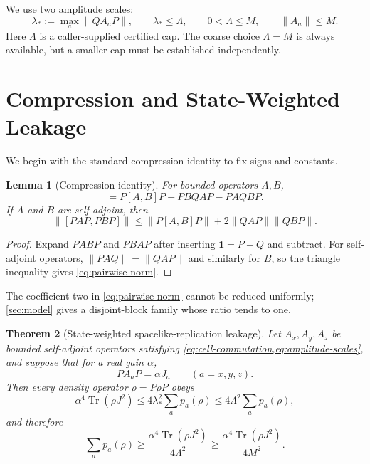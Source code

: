\documentclass[11pt]{article}
\newtheorem{theorem}{Theorem}
\newtheorem{lemma}[theorem]{Lemma}
\theoremstyle{remark}
\newcommand{\1}{\mathbf 1}
\newcommand{\Tr}{\operatorname{Tr}}
\begin{document}
We use two amplitude scales:
\begin{equation}
  \lambda_*:=\max_a\lVert Q A_aP\rVert,
  \qquad \lambda_*\leq\Lambda,
  \qquad 0<\Lambda\leq M,
  \qquad \lVert A_a\rVert\leq M.
  \label{eq:amplitude-scales}
\end{equation}
Here $\Lambda$ is a caller-supplied certified cap. The coarse choice
$\Lambda=M$ is always available, but a smaller cap must be established
independently.

\section{Compression and State-Weighted Leakage}
\label{sec:main}

We begin with the standard compression identity to fix signs and constants.

\begin{lemma}[Compression identity]
\label{lem:compression}
For bounded operators $A,B$,
\begin{equation}
  [PAP,PBP]
  =P[A,B]P+PBQAP-PAQBP.
  \label{eq:compression-identity}
\end{equation}
If $A$ and $B$ are self-adjoint, then
\begin{equation}
  \lVert[PAP,PBP]\rVert
  \leq \lVert P[A,B]P\rVert
       +2\lVert QAP\rVert\lVert QBP\rVert.
  \label{eq:pairwise-norm}
\end{equation}
\end{lemma}

\begin{proof}
Expand $PABP$ and $PBAP$ after inserting $\1=P+Q$ and subtract. For
self-adjoint operators,
$\lVert PAQ\rVert=\lVert QAP\rVert$ and similarly for $B$, so the triangle
inequality gives \cref{eq:pairwise-norm}.
\end{proof}

The coefficient two in \cref{eq:pairwise-norm} cannot be reduced uniformly;
\cref{sec:model} gives a disjoint-block family whose ratio tends to one.

\begin{theorem}[State-weighted spacelike-replication leakage]
\label{thm:three-cell}
Let $A_x,A_y,A_z$ be bounded self-adjoint operators satisfying
\cref{eq:cell-commutation,eq:amplitude-scales}, and suppose that for a real
gain $\alpha$,
\begin{equation}
  P A_aP=\alpha J_a\qquad(a=x,y,z).
  \label{eq:exact-compression}
\end{equation}
Then every density operator $\rho=P\rho P$ obeys
\begin{equation}
  \alpha^4\Tr(\rho J^2)
  \leq 4\lambda_*^2\sum_a p_a(\rho)
  \leq 4\Lambda^2\sum_a p_a(\rho),
  \label{eq:direct-product-form}
\end{equation}
and therefore
\begin{equation}
  \sum_a p_a(\rho)
  \geq \frac{\alpha^4\Tr(\rho J^2)}{4\Lambda^2}
  \geq \frac{\alpha^4\Tr(\rho J^2)}{4M^2}.
  \label{eq:main-bound}
\end{equation}
\end{theorem}
\end{document}
